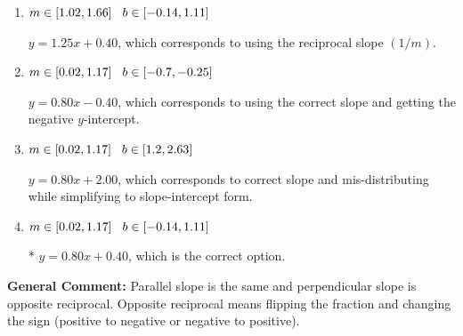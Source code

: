\documentclass{extbook}[14pt]
\begin{document}
\begin{enumerate}
{\begin{enumerate}[label=\Alph*.]
 $y = -0.80x - 12.40$, which corresponds to using the negative slope.
\item \( m \in [1.02, 1.66] \hspace*{3mm} b \in [-0.14, 1.11] \)

 $y = 1.25x + 0.40$, which corresponds to using the reciprocal slope $(1/m)$.
\item \( m \in [0.02, 1.17] \hspace*{3mm} b \in [-0.7, -0.25] \)

 $y = 0.80x - 0.40$, which corresponds to using the correct slope and getting the negative $y$-intercept.
\item \( m \in [0.02, 1.17] \hspace*{3mm} b \in [1.2, 2.63] \)

 $y = 0.80x + 2.00$, which corresponds to correct slope and mis-distributing while simplifying to slope-intercept form.
\item \( m \in [0.02, 1.17] \hspace*{3mm} b \in [-0.14, 1.11] \)

* $y = 0.80x + 0.40$, which is the correct option.
\end{enumerate}

\textbf{General Comment:} Parallel slope is the same and perpendicular slope is opposite reciprocal. Opposite reciprocal means flipping the fraction and changing the sign (positive to negative or negative to positive).
}
\end{enumerate}
\end{document}
